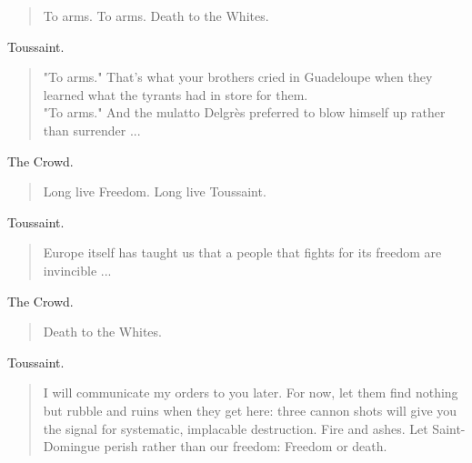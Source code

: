 \documentclass[letterpaper,article,12pt,oneside,notitlepage]{memoir}
\begin{document}
\begin{verse}
\hspace{1cm} To arms. To arms. Death to the Whites. \\
\end{verse}

\begin{center}Toussaint.\end{center}

\begin{verse}
\indent "To arms." That's what your brothers cried in Guadeloupe when they learned what the tyrants had in store for them.  \\
\indent "To arms." And the mulatto Delgrès preferred to blow himself up rather than surrender ...  \\
\end{verse}

\begin{center}The Crowd.\end{center}

\begin{verse}
\hspace{1cm} Long live Freedom. Long live Toussaint. \\
\end{verse}

\begin{center}Toussaint.\end{center}

\begin{verse}
\indent Europe itself has taught us that a people that fights for its freedom are invincible ... \\
\end{verse}

\begin{center}The Crowd.\end{center}

\begin{verse}
\hspace{1cm} Death to the Whites. \\
\end{verse}

\begin{center}Toussaint.\end{center}

\begin{verse}
\indent I will communicate my orders to you later. For now, let them find nothing but rubble and ruins when they get here: three cannon shots will give you the signal for systematic, implacable destruction. Fire and ashes. Let Saint-Domingue perish rather than our freedom: Freedom or death. \\
\end{verse}
\end{document}
